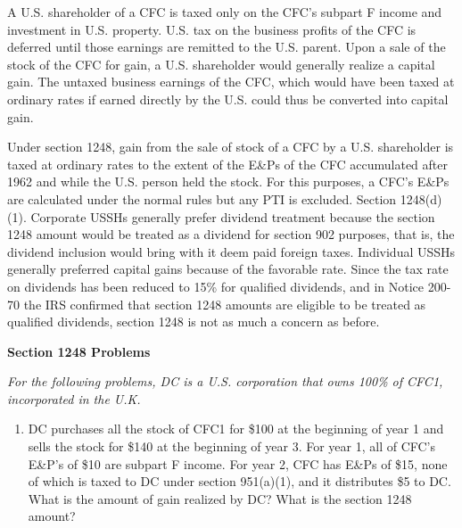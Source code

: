 			A U.S. shareholder of a CFC is taxed only on the CFC's subpart F income and investment in U.S. property.  U.S. tax on the business profits of the CFC is deferred until those earnings are remitted to the U.S. parent.  Upon a sale of the stock of the CFC for gain, a U.S. shareholder would generally realize a capital gain.  The untaxed business earnings of the CFC, which would have been taxed at ordinary rates if earned directly by the U.S. could thus be converted into capital gain.  
			
			Under section 1248, gain from the sale of stock of a CFC by a U.S. shareholder is taxed at ordinary rates to the extent of the E\&Ps of the CFC accumulated after 1962 and while the U.S. person held the stock.  For this purposes, a CFC's E\&Ps are calculated under the normal rules but any PTI is excluded.  Section 1248(d)(1).  Corporate USSHs generally prefer dividend treatment because the section 1248 amount would be treated as a dividend for section 902 purposes, that is, the dividend inclusion would bring with it deem paid foreign taxes.  Individual USSHs generally preferred capital gains because of the favorable rate.  Since the tax rate on dividends has been reduced to 15\% for qualified dividends, and in Notice 200-70 the IRS confirmed that section 1248 amounts are eligible to be treated as qualified dividends, section 1248 is not as much a concern as before.
			
			
	\begin{center}
		\textbf{Section 1248 Problems}
	\end{center}
	\begin{select}
	\emph{For the following problems, DC is a U.S. corporation that owns 100\% of CFC1, incorporated in the U.K.}
			\begin{enumerate}
				\item DC purchases all the stock of CFC1 for \$100 at the beginning of year 1 and sells the stock for \$140 at the beginning of year 3.  For year 1, all of CFC's E\&P's of \$10 are subpart F income.  For year 2, CFC has E\&Ps of \$15, none of which is taxed to DC under section 951(a)(1), and it distributes \$5 to DC.  What is the amount of gain realized by DC? What is the section 1248 amount?
			\end{enumerate}
		\end{select} 	

